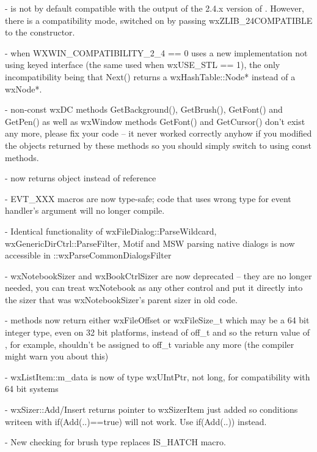 -  is not by default compatible with the output of the
  2.4.x version of . However, there is a compatibility mode,
  switched on by passing wxZLIB\_24COMPATIBLE to the constructor.

- when WXWIN\_COMPATIBILITY\_2\_4 == 0  uses a new implementation
  not using  keyed interface (the same used when wxUSE\_STL == 1),
  the only incompatibility being that Next() returns a wxHashTable::Node*
  instead of a wxNode*.

- non-const wxDC methods GetBackground(), GetBrush(), GetFont() and GetPen()
  as well as wxWindow methods GetFont() and GetCursor() don't exist any more,
  please fix your code -- it never worked correctly anyhow if you modified the
  objects returned by these methods so you should simply switch to using const
  methods.

-  now returns  object instead of reference

- EVT\_XXX macros are now type-safe; code that uses wrong type for event
  handler's argument will no longer compile.

- Identical functionality of wxFileDialog::ParseWildcard,
  wxGenericDirCtrl::ParseFilter, Motif and MSW parsing native dialogs
  is now accessible in ::wxParseCommonDialogsFilter

- wxNotebookSizer and wxBookCtrlSizer are now deprecated -- they are no longer
  needed, you can treat wxNotebook as any other control and put it directly
  into the sizer that was wxNotebookSizer's parent sizer in old code.

-  methods now return either wxFileOffset or wxFileSize\_t which may be a
  64 bit integer type, even on 32 bit platforms, instead of off\_t and so the
  return value of , for example, shouldn't be assigned to off\_t
  variable any more (the compiler might warn you about this)

- wxListItem::m\_data is now of type wxUIntPtr, not long, for compatibility
  with 64 bit systems

- wxSizer::Add/Insert returns pointer to wxSizerItem just added so conditions
  writeen with if(Add(..)==true) will not work. Use if(Add(..)) instead.

- New  checking for brush type replaces IS\_HATCH macro.

